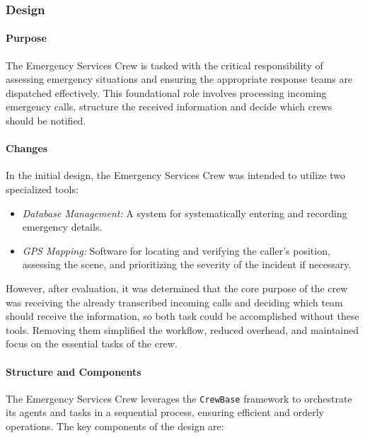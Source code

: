 \subsubsection{Design}
\paragraph{Purpose}
The Emergency Services Crew is tasked with the critical responsibility of assessing emergency situations and ensuring the appropriate response teams are dispatched effectively. This foundational role involves processing incoming emergency calls, structure the received information and decide which crews should be notified.

\paragraph{Changes}
In the initial design, the Emergency Services Crew was intended to utilize two specialized tools:
\begin{itemize}
    \item \textit{Database Management:} A system for systematically entering and recording emergency details.
    \item \textit{GPS Mapping:} Software for locating and verifying the caller’s position, assessing the scene, and prioritizing the severity of the incident if necessary.
\end{itemize}
However, after evaluation, it was determined that the core purpose of the crew was receiving the already transcribed incoming calls and deciding which team should receive the information, so both task could be accomplished without these tools. Removing them simplified the workflow, reduced overhead, and maintained focus on the essential tasks of the crew.

\paragraph{Structure and Components}
The Emergency Services Crew leverages the \texttt{CrewBase} framework to orchestrate its agents and tasks in a sequential process, ensuring efficient and orderly operations. The key components of the design are:

